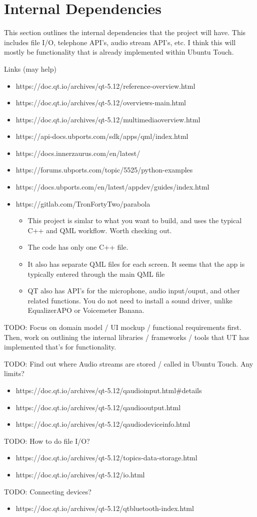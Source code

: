 \section{Internal Dependencies}

This section outlines the internal dependencies that the project will have. This includes file I/O, telephone API's, audio stream API's, etc. I think this will mostly be functionality that is already implemented within Ubuntu Touch.

Links (may help)
\begin{itemize}
	\item https://doc.qt.io/archives/qt-5.12/reference-overview.html
	\item https://doc.qt.io/archives/qt-5.12/overviews-main.html
	\item https://doc.qt.io/archives/qt-5.12/multimediaoverview.html
	\item https://api-docs.ubports.com/sdk/apps/qml/index.html
	\item https://docs.innerzaurus.com/en/latest/
	\item https://forums.ubports.com/topic/5525/python-examples
	\item https://docs.ubports.com/en/latest/appdev/guides/index.html
	\item https://gitlab.com/TronFortyTwo/parabola
	\begin{itemize}
		\item This project is simlar to what you want to build, and uses the typical C++ and QML workflow. Worth checking out.
		\item The code has only one C++ file.
		\item It also has separate QML files for each screen. It seems that the app is typically entered through the main QML file
		\item QT also has API's for the microphone, audio input/ouput, and other related functions. You do not need to install a sound driver, unlike EqualizerAPO or Voicemeter Banana.
	\end{itemize}
\end{itemize}


TODO: Focus on domain model / UI mockup / functional requirements first. Then, work on outlining the internal libraries / frameworks / tools that UT has implemented that's for functionality.




TODO: Find out where Audio streams are stored / called in Ubuntu Touch. Any limits?
\begin{itemize}
	\item https://doc.qt.io/archives/qt-5.12/qaudioinput.html\#details
	\item https://doc.qt.io/archives/qt-5.12/qaudiooutput.html
	\item https://doc.qt.io/archives/qt-5.12/qaudiodeviceinfo.html
\end{itemize}


TODO: How to do file I/O?

\begin{itemize}
	\item https://doc.qt.io/archives/qt-5.12/topics-data-storage.html
	\item https://doc.qt.io/archives/qt-5.12/io.html
\end{itemize}


TODO: Connecting devices?
\begin{itemize}
	\item https://doc.qt.io/archives/qt-5.12/qtbluetooth-index.html
\end{itemize}

